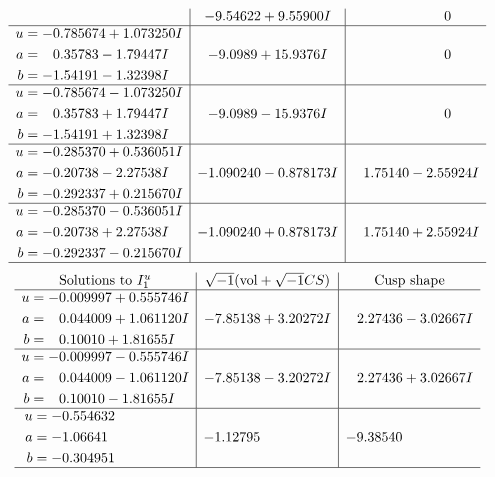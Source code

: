 \documentclass[1p]{elsarticle_modified}
\theoremstyle{definition}
\newcommand{\I}{\sqrt{-1}}
\begin{document}
$$\begin{array}{c|c|c}
 & -9.54622 + 9.55900 I & \phantom{-0.000000 } 0 \\ \hline\begin{aligned}
u &= -0.785674 + 1.073250 I \\
a &= \phantom{-}0.35783 - 1.79447 I \\
b &= -1.54191 - 1.32398 I\end{aligned}
 & -9.0989 + 15.9376 I & \phantom{-0.000000 } 0 \\ \hline\begin{aligned}
u &= -0.785674 - 1.073250 I \\
a &= \phantom{-}0.35783 + 1.79447 I \\
b &= -1.54191 + 1.32398 I\end{aligned}
 & -9.0989 - 15.9376 I & \phantom{-0.000000 } 0 \\ \hline\begin{aligned}
u &= -0.285370 + 0.536051 I \\
a &= -0.20738 - 2.27538 I \\
b &= -0.292337 + 0.215670 I\end{aligned}
 & -1.090240 - 0.878173 I & \phantom{-}1.75140 - 2.55924 I \\ \hline\begin{aligned}
u &= -0.285370 - 0.536051 I \\
a &= -0.20738 + 2.27538 I \\
b &= -0.292337 - 0.215670 I\end{aligned}
 & -1.090240 + 0.878173 I & \phantom{-}1.75140 + 2.55924 I\\
 \hline 
 \end{array}$$\newpage$$\begin{array}{c|c|c}  
\text{Solutions to }I^u_{1}& \I (\text{vol} + \sqrt{-1}CS) & \text{Cusp shape}\\
 \hline 
\begin{aligned}
u &= -0.009997 + 0.555746 I \\
a &= \phantom{-}0.044009 + 1.061120 I \\
b &= \phantom{-}0.10010 + 1.81655 I\end{aligned}
 & -7.85138 + 3.20272 I & \phantom{-}2.27436 - 3.02667 I \\ \hline\begin{aligned}
u &= -0.009997 - 0.555746 I \\
a &= \phantom{-}0.044009 - 1.061120 I \\
b &= \phantom{-}0.10010 - 1.81655 I\end{aligned}
 & -7.85138 - 3.20272 I & \phantom{-}2.27436 + 3.02667 I \\ \hline\begin{aligned}
u &= -0.554632\phantom{ +0.000000I} \\
a &= -1.06641\phantom{ +0.000000I} \\
b &= -0.304951\phantom{ +0.000000I}\end{aligned}
 & -1.12795\phantom{ +0.000000I} & -9.38540\phantom{ +0.000000I}\\
 \hline 
 \end{array}$$\newpage\newpage\renewcommand{\arraystretch}{1}
\end{document}
